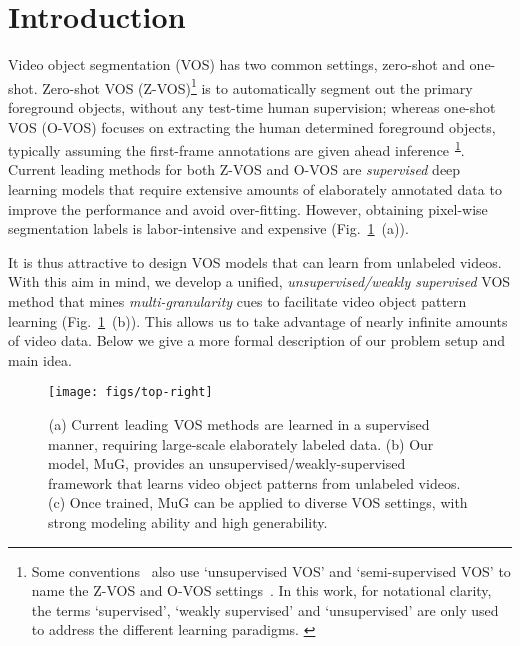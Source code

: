 \documentclass[10pt,twocolumn,letterpaper]{article}
\begin{document}
\section{Introduction}
\vspace{-1pt}
Video object segmentation (VOS) has two common settings, zero-shot and one-shot.
Zero-shot VOS (Z-VOS)\footnote{Some conventions~\!\cite{perazzi2016benchmark,DBLP:conf/cvpr/WangSP15} also use `unsupervised VOS' and `semi-supervised VOS' to name the Z-VOS and O-VOS settings~\!\cite{Caelles_2017_CVPR}. In this work, for notational clarity, the terms `supervised', `weakly supervised' and `unsupervised' are only used to address the different learning paradigms. \label{notation}} is to automatically segment out the primary foreground objects, without any test-time human supervision; whereas one-shot VOS (O-VOS) focuses on extracting the human determined foreground objects, typically assuming the first-frame annotations are given ahead inference\textsuperscript{~\!\ref{notation}}. Current leading methods for both Z-VOS and O-VOS are \textit{supervised} deep learning models that require extensive amounts of elaborately annotated data to improve the performance and avoid over-fitting. However, obtaining pixel-wise segmentation labels is labor-intensive and expensive (Fig.~\!\ref{fig:top-right}~\!(a)).

It is thus attractive to design VOS models that can learn from unlabeled videos. With this aim in mind, we develop a unified, \textit{unsupervised/weakly supervised} VOS method that mines \textit{multi-granularity} cues to facilitate video object pattern learning (Fig.~\!\ref{fig:top-right}~\!(b)). This allows us to take advantage of nearly infinite amounts of video data. Below we give a more
formal description of our problem setup and main idea.

\begin{figure}[t]
\centering
	\texttt{[image: figs/top-right]}
	\vspace{-9pt}
	\captionsetup{font=small}
	\caption{\small{$_{\!}$(a) Current$_{\!}$ leading$_{\!}$ VOS methods$_{\!}$ are$_{\!}$  learned in a supervised manner,  requiring large-scale elaborately labeled data. (b) Our model, MuG, provides an unsupervised/weakly-supervised framework that learns video object patterns from unlabeled videos. (c) Once trained, MuG can be applied to diverse VOS settings, with strong modeling ability and high generability.
		}
	}
	\label{fig:top-right}
	\vspace{-13pt}
\end{figure}
\end{document}
